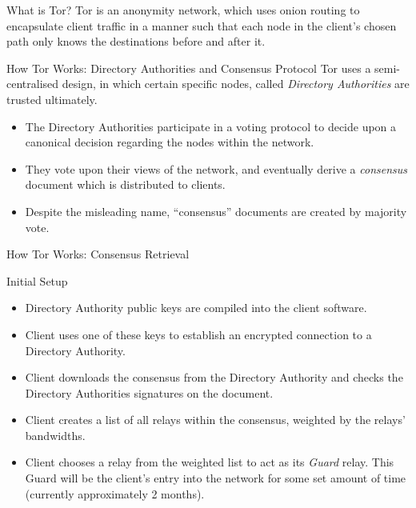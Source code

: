 \documentclass[9pt,a4paper,handout]{beamer}
\begin{document}
\begin{frame}{What is Tor?}
  Tor is an anonymity network, which uses onion routing to encapsulate client traffic in a manner
  such that each node in the client's chosen path only knows the destinations before and after it.
\end{frame}


\begin{frame}{How Tor Works: Directory Authorities and Consensus Protocol}
  Tor uses a semi-centralised design, in which certain specific nodes, called
  \emph{Directory Authorities} are trusted ultimately.

  \begin{itemize}
    \item<2-> The Directory Authorities participate in a
      voting protocol to decide upon a canonical decision regarding the nodes within the network.
    \item<3-> They vote upon their views of the network, and eventually derive a \emph{consensus}
      document which is distributed to clients.
    \item<4-> Despite the misleading name, ``consensus'' documents are created by majority vote.
  \end{itemize}
\end{frame}


\begin{frame}{How Tor Works: Consensus Retrieval}
  \begin{block}{Initial Setup}
    \begin{itemize}
      \item<1-> Directory Authority public keys are compiled into the client software.
      \item<2-> Client uses one of these keys to establish an encrypted connection to a
        Directory Authority.
      \item<3-> Client downloads the consensus from the Directory Authority and checks the Directory
        Authorities signatures on the document.
      \item<4-> Client creates a list of all relays within the consensus, weighted by the relays' bandwidths.
      \item<5-> Client chooses a relay from the weighted list to act as its
        \emph{Guard} relay. This Guard will be the client's entry into the network for some set amount
        of time (currently approximately 2 months).
  \end{itemize}
  \end{block}

\end{frame}
\end{document}
